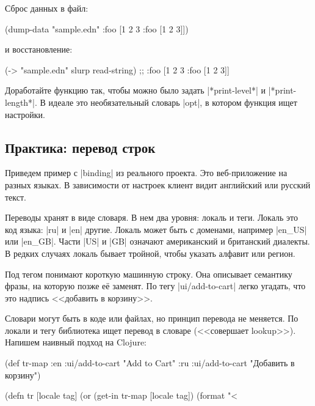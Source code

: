 \noindent
Сброс данных в файл:

\begin{english}
  \begin{clojure}
(dump-data "sample.edn" {:foo [1 2 3 {:foo [1 2 3]}]})
  \end{clojure}
\end{english}

\noindent
и восстановление:

\begin{english}
  \begin{clojure}
(-> "sample.edn" slurp read-string)
;; {:foo [1 2 3 {:foo [1 2 3]}]}
  \end{clojure}
\end{english}


Доработайте функцию так, чтобы можно было задать \spverb|*print-level*| и
\spverb|*print-length*|. В идеале это необязательный словарь \spverb|opt|, в
котором функция ищет настройки.

\subsection{Практика: перевод строк}

Приведем пример с \spverb|binding| из реального проекта. Это веб-приложение на
разных языках. В зависимости от настроек клиент видит английский или русский
текст.


Переводы хранят в виде словаря. В нем два уровня: локаль и теги. Локаль это код
языка: \spverb|ru| и \spverb|en| другие. Локаль может быть с доменами, например
\spverb|en_US| или \spverb|en_GB|. Части \spverb|US| и \spverb|GB| означают
американский и британский диалекты. В редких случаях локаль бывает тройной,
чтобы указать алфавит или регион.

Под тегом понимают короткую машинную строку. Она описывает семантику фразы, на
которую позже е\"{е} заменят. По тегу \spverb|ui/add-to-cart| легко
угадать, что это надпись <<добавить в корзину>>.

Словари могут быть в коде или файлах, но принцип перевода не меняется. По локали
и тегу библиотека ищет перевод в словаре (<<совершает lookup>>). Напишем
наивный подход на Clojure:

  \begin{clojure}
(def tr-map
  {:en {:ui/add-to-cart "Add to Cart"}
   :ru {:ui/add-to-cart "Добавить в корзину"}})

(defn tr [locale tag]
  (or (get-in tr-map [locale tag])
      (format "<%
  \end{clojure}

